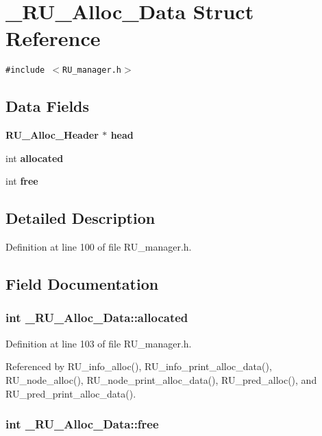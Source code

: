 \section{\_\-RU\_\-Alloc\_\-Data Struct Reference}
\label{struct__RU__Alloc__Data}
{\tt \#include $<$RU\_\-manager.h$>$}

\subsection*{Data Fields}
\begin{CompactItemize}
\item 
\bf{RU\_\-Alloc\_\-Header} $\ast$ \bf{head}
\item 
int \bf{allocated}
\item 
int \bf{free}
\end{CompactItemize}


\subsection{Detailed Description}




Definition at line 100 of file RU\_\-manager.h.

\subsection{Field Documentation}
\subsubsection{\setlength{\rightskip}{0pt plus 5cm}int \bf{\_\-RU\_\-Alloc\_\-Data::allocated}}\label{struct__RU__Alloc__Data_e35d390e52eb5e7b1f6840706f75812b}




Definition at line 103 of file RU\_\-manager.h.

Referenced by RU\_\-info\_\-alloc(), RU\_\-info\_\-print\_\-alloc\_\-data(), RU\_\-node\_\-alloc(), RU\_\-node\_\-print\_\-alloc\_\-data(), RU\_\-pred\_\-alloc(), and RU\_\-pred\_\-print\_\-alloc\_\-data().
\subsubsection{\setlength{\rightskip}{0pt plus 5cm}int \bf{\_\-RU\_\-Alloc\_\-Data::free}}\label{struct__RU__Alloc__Data_1d4c5a9525653b224315236d1f5bcdf1}




